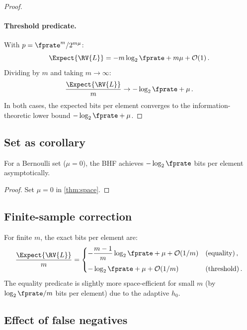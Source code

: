 \begin{proof}
\paragraph{Threshold predicate.}
With $p = \fprate^{m}/2^{m\mu}$:
\begin{equation}
    \Expect{\RV{L}}
        = -m\log_2 \fprate + m\mu + \mathcal{O}(1)\,.
\end{equation}
Dividing by $m$ and taking $m \to \infty$:
\begin{equation}
    \frac{\Expect{\RV{L}}}{m} \to -\log_2 \fprate + \mu\,.
\end{equation}
In both cases, the expected bits per element converges to the information-theoretic lower bound $-\log_2 \fprate + \mu$.
\end{proof}

\subsection{Set as corollary}

\begin{corollary}
\label{cor:set_space}
For a Bernoulli set ($\mu = 0$), the BHF achieves $-\log_2 \fprate$ bits per
element asymptotically.
\end{corollary}
\begin{proof}
Set $\mu = 0$ in \cref{thm:space}.
\end{proof}

\subsection{Finite-sample correction}

For finite $m$, the exact bits per element are:
\begin{equation}
    \frac{\Expect{\RV{L}}}{m} =
    \begin{cases}
        -\dfrac{m-1}{m}\log_2 \fprate + \mu + \mathcal{O}(1/m)
            & \text{(equality)}\,,\\[8pt]
        -\log_2 \fprate + \mu + \mathcal{O}(1/m)
            & \text{(threshold)}\,.
    \end{cases}
\end{equation}
The equality predicate is slightly more space-efficient for small $m$
(by $\log_2 \fprate / m$ bits per element) due to the adaptive $h_0$.

\subsection{Effect of false negatives}

